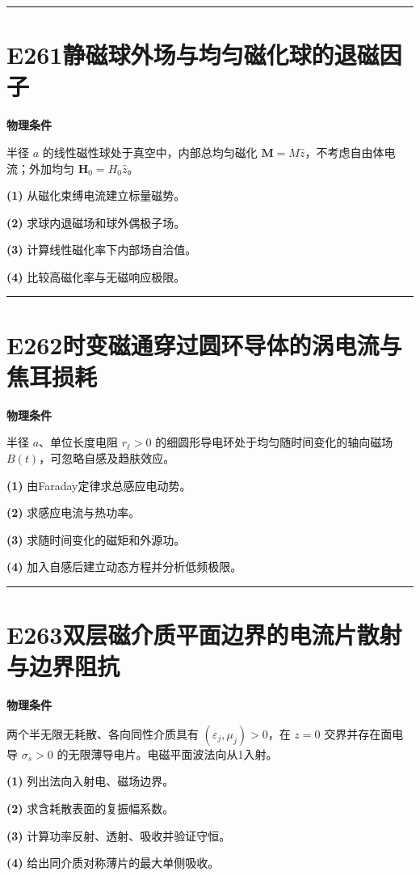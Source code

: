 \documentclass[UTF8,a4paper,11pt,oneside,openany]{ctexbook}
\begin{document}
\par\bigskip\hrule\bigskip
\section*{E261\quad 静磁球外场与均匀磁化球的退磁因子}
\textbf{物理条件}\par 半径 \(a\) 的线性磁性球处于真空中，内部总均匀磁化 \(\boldsymbol M=M\hat z\)，不考虑自由体电流；外加均匀 \(\boldsymbol H_0=H_0\hat z\)。
\par\noindent\textbf{(1)} 从磁化束缚电流建立标量磁势。
\par\noindent\textbf{(2)} 求球内退磁场和球外偶极子场。
\par\noindent\textbf{(3)} 计算线性磁化率下内部场自洽值。
\par\noindent\textbf{(4)} 比较高磁化率与无磁响应极限。

\par\bigskip\hrule\bigskip
\section*{E262\quad 时变磁通穿过圆环导体的涡电流与焦耳损耗}
\textbf{物理条件}\par 半径 \(a\)、单位长度电阻 \(r_\ell>0\) 的细圆形导电环处于均匀随时间变化的轴向磁场 \(B(t)\)，可忽略自感及趋肤效应。
\par\noindent\textbf{(1)} 由Faraday定律求总感应电动势。
\par\noindent\textbf{(2)} 求感应电流与热功率。
\par\noindent\textbf{(3)} 求随时间变化的磁矩和外源功。
\par\noindent\textbf{(4)} 加入自感后建立动态方程并分析低频极限。

\par\bigskip\hrule\bigskip
\section*{E263\quad 双层磁介质平面边界的电流片散射与边界阻抗}
\textbf{物理条件}\par 两个半无限无耗散、各向同性介质具有 \((\varepsilon_j,\mu_j)>0\)，在 \(z=0\) 交界并存在面电导 \(\sigma_s>0\) 的无限薄导电片。电磁平面波法向从1入射。
\par\noindent\textbf{(1)} 列出法向入射电、磁场边界。
\par\noindent\textbf{(2)} 求含耗散表面的复振幅系数。
\par\noindent\textbf{(3)} 计算功率反射、透射、吸收并验证守恒。
\par\noindent\textbf{(4)} 给出同介质对称薄片的最大单侧吸收。
\end{document}
